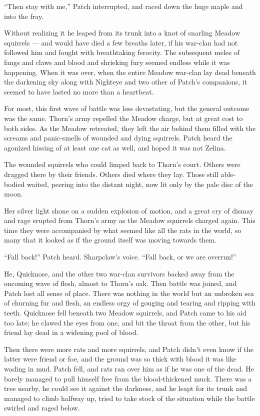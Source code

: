 \documentclass[12pt]{memoir}
\begin{document}
“Then stay with me,” Patch interrupted, and raced down the huge maple
and into the fray.

Without realizing it he leaped from its trunk into a knot of snarling
Meadow squirrels — and would have died a few breaths later, if his
war-clan had not followed him and fought with breathtaking
ferocity. The subsequent melee of fangs and claws and blood and
shrieking fury seemed endless while it was happening. When it was
over, when the entire Meadow war-clan lay dead beneath the darkening
sky along with Nighteye and two other of Patch’s companions, it seemed
to have lasted no more than a heartbeat.

For most, this first wave of battle was less devastating, but the
general outcome was the same. Thorn’s army repelled the Meadow charge,
but at great cost to both sides. As the Meadow retreated, they left
the air behind them filled with the screams and panic-smells of
wounded and dying squirrels. Patch heard the agonized hissing of at
least one cat as well, and hoped it was not Zelina.

The wounded squirrels who could limped back to Thorn’s court. Others
were dragged there by their friends. Others died where they lay. Those
still able-bodied waited, peering into the distant night, now lit only
by the pale disc of the moon.

Her silver light shone on a sudden explosion of motion, and a great
cry of dismay and rage erupted from Thorn’s army as the Meadow
squirrels charged again. This time they were accompanied by what
seemed like all the rats in the world, so many that it looked as if
the ground itself was moving towards them.

“Fall back!” Patch heard. Sharpclaw’s voice. “Fall back, or we are
overrun!”

He, Quicknose, and the other two war-clan survivors backed away from
the oncoming wave of flesh, almost to Thorn’s oak. Then battle was
joined, and Patch lost all sense of place. There was nothing in the
world but an unbroken sea of churning fur and flesh, an endless orgy
of gouging and tearing and ripping with teeth. Quicknose fell beneath
two Meadow squirrels, and Patch came to his aid too late; he clawed
the eyes from one, and bit the throat from the other, but his friend
lay dead in a widening pool of blood.

Then there were more rats and more squirrels, and Patch didn’t even
know if the latter were friend or foe, and the ground was so thick
with blood it was like wading in mud. Patch fell, and rats ran over
him as if he was one of the dead. He barely managed to pull himself
free from the blood-thickened muck. There was a tree nearby, he could
see it against the darkness, and he leapt for its trunk and managed to
climb halfway up, tried to take stock of the situation while the
battle swirled and raged below.
\end{document}
